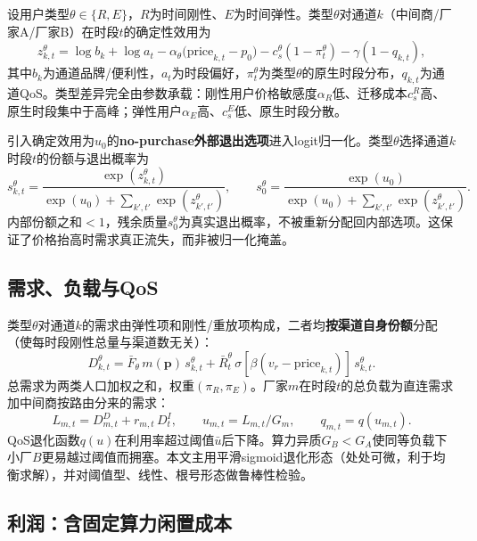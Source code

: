 \documentclass[UTF8,11pt]{ctexart}
\newcommand{\qos}{q}
\newcommand{\D}{D}
\newcommand{\p}{\boldsymbol{p}}
\begin{document}
设用户类型$\theta\in\{R,E\}$，$R$为时间刚性、$E$为时间弹性。类型$\theta$对通道$k$（中间商/厂家A/厂家B）在时段$t$的确定性效用为
\begin{equation}
  z^\theta_{k,t}=\log b_k+\log a_t-\alpha_\theta\big(\text{price}_{k,t}-p_0\big)
  -c_s^\theta(1-\pi^\theta_t)-\gamma(1-q_{k,t}),
  \label{eq:utility}
\end{equation}
其中$b_k$为通道品牌/便利性，$a_t$为时段偏好，$\pi^\theta_t$为类型$\theta$的原生时段分布，$q_{k,t}$为通道QoS。类型差异完全由参数承载：刚性用户价格敏感度$\alpha_R$低、迁移成本$c_s^R$高、原生时段集中于高峰；弹性用户$\alpha_E$高、$c_s^E$低、原生时段分散。

引入确定效用为$u_0$的\textbf{no-purchase外部退出选项}进入logit归一化。类型$\theta$选择通道$k$时段$t$的份额与退出概率为
\begin{equation}
  s^\theta_{k,t}=\frac{\exp(z^\theta_{k,t})}{\exp(u_0)+\sum_{k',t'}\exp(z^\theta_{k',t'})},
  \qquad
  s^\theta_0=\frac{\exp(u_0)}{\exp(u_0)+\sum_{k',t'}\exp(z^\theta_{k',t'})}.
  \label{eq:share}
\end{equation}
内部份额之和$<1$，残余质量$s^\theta_0$为真实退出概率，不被重新分配回内部选项。这保证了价格抬高时需求真正流失，而非被归一化掩盖。

\subsection{需求、负载与QoS}

类型$\theta$对通道$k$的需求由弹性项和刚性/重放项构成，二者均\textbf{按渠道自身份额}分配（使每时段刚性总量与渠道数无关）：
\begin{equation}
  \D^\theta_{k,t}=\bar F_\theta\,m(\p)\,s^\theta_{k,t}
  +\bar R^\theta_t\,\sigma[\beta(v_r-\text{price}_{k,t})]\,s^\theta_{k,t}.
  \label{eq:demand}
\end{equation}
总需求为两类人口加权之和，权重$(\pi_R,\pi_E)$。厂家$m$在时段$t$的总负载为直连需求加中间商按路由分来的需求：
\begin{equation}
  L_{m,t}=\D^D_{m,t}+r_{m,t}\,\D^I_t,\qquad u_{m,t}=L_{m,t}/G_m,\qquad q_{m,t}=\qos(u_{m,t}).
  \label{eq:load}
\end{equation}
QoS退化函数$\qos(u)$在利用率超过阈值$\bar u$后下降。算力异质$G_B<G_A$使同等负载下小厂$B$更易越过阈值而拥塞。本文主用平滑sigmoid退化形态（处处可微，利于均衡求解），并对阈值型、线性、根号形态做鲁棒性检验。

\subsection{利润：含固定算力闲置成本}
\end{document}
